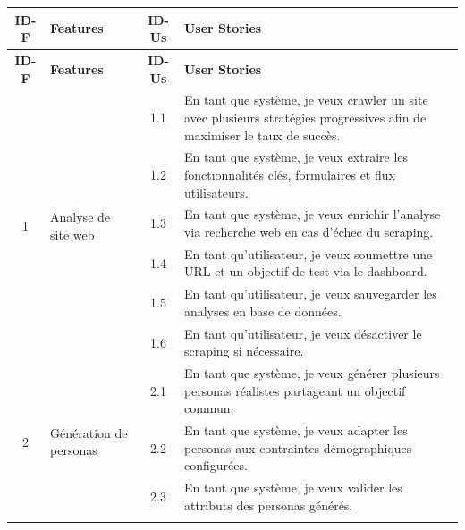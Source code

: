 \begin{center}
\small
\begin{longtable}{|c|p{3.5cm}|c|p{7cm}|}
\hline
\rowcolor{gray!20}
\textbf{ID-F} & \textbf{Features} & \textbf{ID-Us} & \textbf{User Stories} \\
\hline
\endfirsthead

\hline
\rowcolor{gray!20}
\textbf{ID-F} & \textbf{Features} & \textbf{ID-Us} & \textbf{User Stories} \\
\hline
\endhead

\multirow{6}{*}{1} & 
\multirow{6}{3.5cm}{Analyse de site web} 
& 1.1 & En tant que système, je veux crawler un site avec plusieurs stratégies progressives afin de maximiser le taux de succès. \\ \cline{3-4}

& & 1.2 & En tant que système, je veux extraire les fonctionnalités clés, formulaires et flux utilisateurs. \\ \cline{3-4}

& & 1.3 & En tant que système, je veux enrichir l'analyse via recherche web en cas d'échec du scraping. \\ \cline{3-4}

& & 1.4 & En tant qu'utilisateur, je veux soumettre une URL et un objectif de test via le dashboard. \\ \cline{3-4}

& & 1.5 & En tant qu'utilisateur, je veux sauvegarder les analyses en base de données. \\ \cline{3-4}

& & 1.6 & En tant qu'utilisateur, je veux désactiver le scraping si nécessaire. \\

\hline

\multirow{6}{*}{2} & 
\multirow{6}{3.5cm}{Génération de personas} 

& 2.1 & En tant que système, je veux générer plusieurs personas réalistes partageant un objectif commun. \\ \cline{3-4}

& & 2.2 & En tant que système, je veux adapter les personas aux contraintes démographiques configurées. \\ \cline{3-4}

& & 2.3 & En tant que système, je veux valider les attributs des personas générés. \\ \cline{3-4}


\end{longtable}
\end{center}

